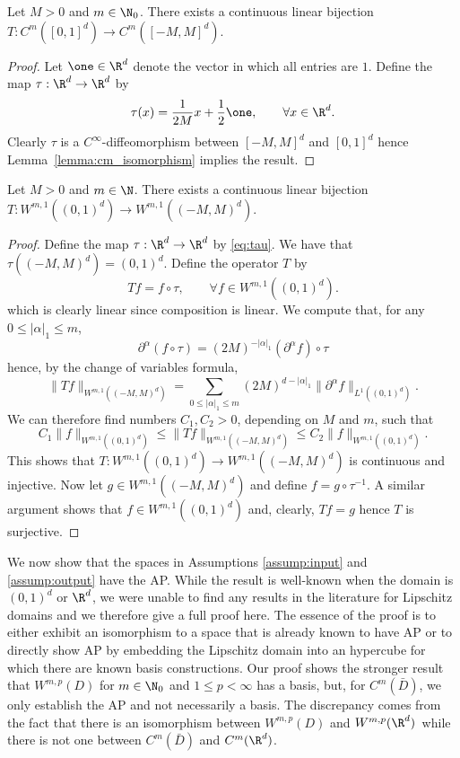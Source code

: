\begin{corollary}
\label{corr:cm_isomorphism}
Let \(M > 0\) and \(m \in \N_0\). There exists a continuous linear bijection \(T : C^m([0,1]^d) \to C^m([-M,M]^d)\).
\end{corollary}
\begin{proof}
Let $\one \in \R^d$ denote the vector in which all entries are $1$. 
Define the map \(\tau : \R^d \to \R^d\) by
\begin{equation}
\label{eq:tau}
\tau(x) = \frac{1}{2M} x + \frac{1}{2}\one, \qquad \forall x \in \R^d.
\end{equation}
Clearly \(\tau\) is a \(C^\infty\)-diffeomorphism between \([-M,M]^d\) and \([0,1]^d\)
hence Lemma~\ref{lemma:cm_isomorphism} implies the result.
\end{proof}

\begin{lemma}
\label{lemma:w1_isomorphism}
Let \(M > 0\) and \(m \in \N\). There exists a continuous linear bijection \(T : W^{m,1}((0,1)^d) \to W^{m,1}((-M,M)^d)\).
\end{lemma}
\begin{proof}
Define the map \(\tau : \R^d \to \R^d\) by \eqref{eq:tau}.
We have that \(\tau((-M,M)^d) = (0,1)^d\). Define the operator \(T\) by
\[Tf = f \circ \tau, \qquad \forall f \in W^{m,1}((0,1)^d).\]
which is clearly linear since composition is linear. We compute that, for any \(0 \leq |\alpha|_1 \leq m\),
\[\partial^\alpha (f \circ \tau) = (2M)^{-|\alpha|_1} (\partial^\alpha f) \circ \tau\]
hence, by the change of variables formula, 
\[\|Tf\|_{W^{m,1}((-M,M)^d)} = \sum_{0 \leq |\alpha|_1 \leq m} (2M)^{d - |\alpha|_1} \|\partial^\alpha f\|_{L^1((0,1)^d)}. \]
We can therefore find numbers \(C_1,C_2 > 0\), depending on \(M\) and \(m\), such that
\[C_1 \|f\|_{W^{m,1}((0,1)^d)} \leq \|Tf\|_{W^{m,1}((-M,M)^d)} \leq C_2 \|f\|_{W^{m,1}((0,1)^d)}.\]
This shows that \(T : W^{m,1}((0,1)^d) \to W^{m,1}((-M,M)^d)\) is continuous and injective.
Now let \(g \in W^{m,1}((-M,M)^d)\) and define \(f = g \circ \tau^{-1}\). A similar argument shows that
\(f \in W^{m,1}((0,1)^d)\) and, clearly, \(Tf = g\) hence \(T\) is surjective.
\end{proof}

We now show that the spaces in Assumptions \ref{assump:input} and \ref{assump:output} have the AP. While the result is well-known when the domain is \((0,1)^d\) or \(\R^d\), we were unable to find any results in the literature for Lipschitz domains and we therefore give a full proof here. The essence of the proof is to either exhibit an isomorphism to a space that is already known to have AP or to directly show AP by embedding the Lipschitz domain into an hypercube for which there are known basis constructions. Our proof shows the stronger result that \(W^{m,p}(D)\) for \(m \in \N_0\) and \(1 \leq p < \infty\) has a basis, but, for \(C^m (\bar{D})\), we only establish the AP and not necessarily a basis. The discrepancy comes from the fact that there is an isomorphism between \(W^{m,p}(D)\) and \(W^{m,p}(\R^d)\)\ while there is not one between \(C^m(\bar{D})\) and \(C^m(\R^d)\).

